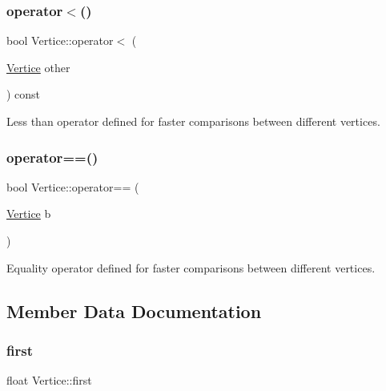 \subsubsection{\texorpdfstring{operator$<$()}{operator<()}}
{\footnotesize\ttfamily bool Vertice\+::operator$<$ (\begin{DoxyParamCaption}\item[{\hyperlink{structVertice}{Vertice}}]{other }\end{DoxyParamCaption}) const\hspace{0.3cm}{\ttfamily [inline]}}



Less than operator defined for faster comparisons between different vertices. 

\mbox{\label{structVertice_a17d6154f69e230b4c927fe70e8442f4c}} 
\subsubsection{\texorpdfstring{operator==()}{operator==()}}
{\footnotesize\ttfamily bool Vertice\+::operator== (\begin{DoxyParamCaption}\item[{\hyperlink{structVertice}{Vertice}}]{b }\end{DoxyParamCaption})\hspace{0.3cm}{\ttfamily [inline]}}



Equality operator defined for faster comparisons between different vertices. 



\subsection{Member Data Documentation}
\mbox{\label{structVertice_a458c4138041414f66cc8234dcb8a76a8}} 
\subsubsection{\texorpdfstring{first}{first}}
{\footnotesize\ttfamily float Vertice\+::first}

\mbox{\label{structVertice_ae1b4f2a0c6783f5cf06b6dbcc49f8231}} 
